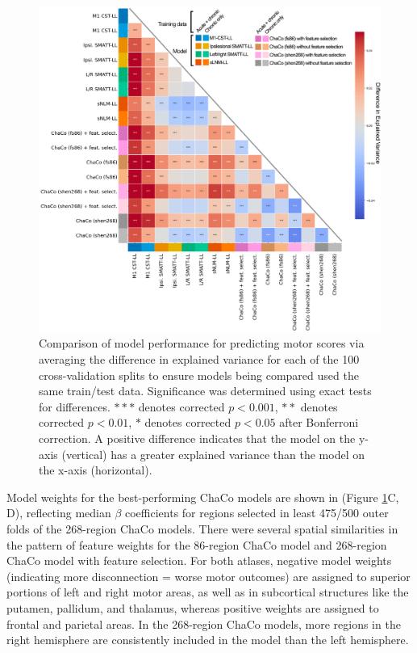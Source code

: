 \documentclass[10pt]{article}
\begin{document}
\begin{figure}[hp]
\centering
\includegraphics[width=1\linewidth]{figures/analysis_1_matrix_figure_colors.png}
\caption{Comparison of model performance for predicting motor scores via averaging the difference in explained variance for each of the 100 cross-validation splits to ensure models being compared used the same train/test data. Significance was determined using exact tests for differences. $***$ denotes corrected $p < 0.001$, $**$ denotes corrected $p < 0.01$, $*$ denotes corrected $p < 0.05$ after Bonferroni correction. A positive difference indicates that the model on the y-axis (vertical) has a greater explained variance than the model on the x-axis (horizontal).
 }
\label{analysis1}
\end{figure}

Model weights for the best-performing ChaCo models are shown in (Figure \ref{analysis1}C, D), reflecting median $\beta$ coefficients for regions selected in least 475/500 outer folds of the 268-region ChaCo models. There were several spatial similarities in the pattern of feature weights for the 86-region ChaCo model and 268-region ChaCo model with feature selection. For both atlases, negative model weights (indicating more disconnection = worse motor outcomes) are assigned to superior portions of left and right motor areas, as well as in subcortical structures like the putamen, pallidum, and thalamus, whereas positive weights are assigned to frontal and parietal areas. In the 268-region ChaCo models, more regions in the right hemisphere are consistently included in the model than the left hemisphere. 
\end{document}
